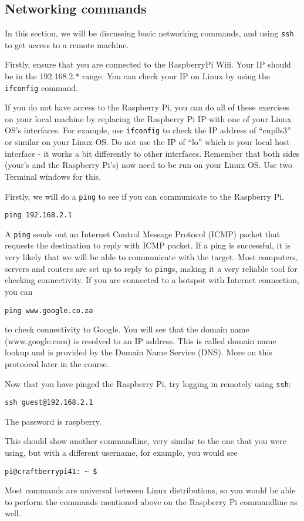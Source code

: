 \documentclass[a4paper]{article}
\begin{document}
\subsection{Networking commands}
In this section, we will be discussing basic networking commands, and using \texttt{ssh} to get access to a remote machine. 

Firstly, ensure that you are connected to the RaspberryPi Wifi. Your IP should be in the 192.168.2.* range. You can check your IP on Linux by using the \texttt{ifconfig} command. 

If you do not have access to the Raspberry Pi, you can do all of these exercises on your local machine by replacing the Raspberry Pi IP with one of your Linux OS's interfaces. For example, use \texttt{ifconfig} to check the IP address of ``enp0s3'' or similar on your Linux OS. Do not use the IP of ``lo'' which is your local host interface - it works a bit differently to other interfaces. Remember that both sides (your's and the Raspberry Pi's) now need to be run on your Linux OS. Use two Terminal windows for this. 

Firstly, we will do a \texttt{ping} to see if you can communicate to the Raspberry Pi. 
\begin{lstlisting}
ping 192.168.2.1
\end{lstlisting}
A \texttt{ping} sends out an Internet Control Message Protocol (ICMP) packet that requests the destination to reply with ICMP packet. If a ping is successful, it is very likely that we will be able to communicate with the target. Most computers, servers and routers are set up to reply to \texttt{ping}s, making it a very reliable tool for checking connectivity. If you are connected to a hotspot with Internet connection, you can
\begin{lstlisting}
ping www.google.co.za
\end{lstlisting}
to check connectivity to Google. You will see that the domain name (www.google.com) is resolved to an IP address. This is called domain name lookup and is provided by the Domain Name Service (DNS). More on this protoocol later in the course. 

Now that you have pinged the Raspberry Pi, try logging in remotely using \texttt{ssh}:
\begin{lstlisting}
ssh guest@192.168.2.1
\end{lstlisting}
The password is raspberry.

This should show another commandline, very similar to the one that you were using, but with a different username, for example, you would see 
\begin{lstlisting}
pi@craftberrypi41: ~ $
\end{lstlisting}
Most commands are universal between Linux distributions, so you would be able to perform the commands mentioned above on the Raspberry Pi commandline as well. 
\end{document}

